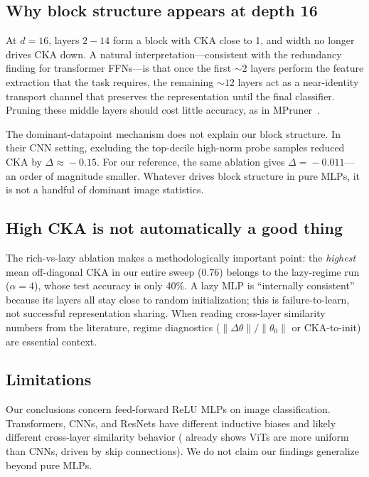 \subsection{Why block structure appears at depth 16}

At $d\!=\!16$, layers $2\!-\!14$ form a block with CKA close to 1, and width no longer drives CKA down. A natural interpretation---consistent with the \citet{pessoa2023onewide} redundancy finding for transformer FFNs---is that once the first $\sim\!2$ layers perform the feature extraction that the task requires, the remaining $\sim\!12$ layers act as a near-identity transport channel that preserves the representation until the final classifier. Pruning these middle layers should cost little accuracy, as in MPruner~\citep{park2024mpruner}.

The \citet{nguyen2022origins} dominant-datapoint mechanism does not explain our block structure. In their CNN setting, excluding the top-decile high-norm probe samples reduced CKA by $\Delta \approx\!-0.15$. For our  reference, the same ablation gives $\Delta\!=\!-0.011$---an order of magnitude smaller. Whatever drives block structure in pure MLPs, it is not a handful of dominant image statistics.

\subsection{High CKA is not automatically a good thing}

The rich-vs-lazy ablation makes a methodologically important point: the \emph{highest} mean off-diagonal CKA in our entire sweep (0.76) belongs to the lazy-regime run ($\alpha\!=\!4$), whose test accuracy is only 40\%. A lazy MLP is ``internally consistent'' because its layers all stay close to random initialization; this is failure-to-learn, not successful representation sharing. When reading cross-layer similarity numbers from the literature, regime diagnostics ($\|\Delta\theta\|/\|\theta_0\|$ or CKA-to-init) are essential context.

\subsection{Limitations}

 Our conclusions concern feed-forward ReLU MLPs on image classification. Transformers, CNNs, and ResNets have different inductive biases and likely different cross-layer similarity behavior (\citet{raghu2021vit} already shows ViTs are more uniform than CNNs, driven by skip connections). We do not claim our findings generalize beyond pure MLPs.

